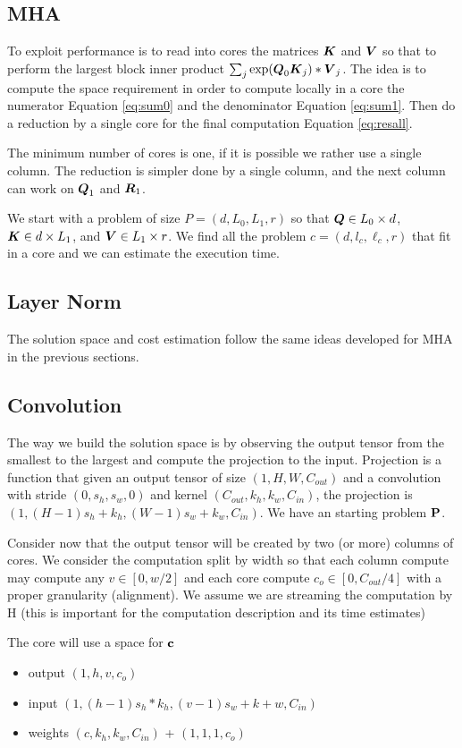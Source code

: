 \documentclass[conference]{IEEEtran}
\begin{document}
\subsection{MHA}
To exploit performance is to read into cores the matrices ${\boldsymbol K}$ and
${\boldsymbol V}$ so that to perform the largest block inner product
$\sum_j\exp({\boldsymbol Q}_0{\boldsymbol K}_j)*{\boldsymbol V}_j$. The idea is to compute the
space requirement in order to compute locally in a core the numerator
Equation \ref{eq:sum0} and the denominator Equation
\ref{eq:sum1}. Then do a reduction by a single core for the final
computation Equation \ref{eq:resall}.

The minimum number of cores is one, if it is possible we rather use a
single column. The reduction is simpler done by a single column, and
the next column can work on ${\boldsymbol Q}_1$ and ${\boldsymbol R}_1$.

We start with a problem of size $P=(d,L_0,L_1,r)$ so that ${\boldsymbol Q} \in
L_0\times d$, ${\boldsymbol K} \in d\times L_1$, and ${\boldsymbol V} \in L_1\times
r$. We find all the problem $c=(d,l_c,\ell_c,r)$ that fit in a core
and we can estimate the execution time.

\subsection{Layer Norm}
The solution space and cost estimation follow the same ideas developed
for MHA in the previous sections.

\subsection{Convolution}
The way we build the solution space is by observing the output tensor
from the smallest to the largest and compute the projection to the
input. Projection is a function that given an output tensor of size
$(1,H,W,C_{out})$ and a convolution with stride $(0, s_h, s_w,0)$ and
kernel $(C_{out}, k_h, k_w,C_{in})$, the projection is $(1,
(H-1)s_h+k_h, (W-1)s_w+k_w,C_{in})$. We have an starting problem ${\bf
  P}$.

Consider now that the output tensor will be created by two (or more)
columns of cores. We consider the computation split by width so that
each column compute may compute any $v \in [0,w/2]$ and each core
compute $c_o \in [0,C_{out}/4]$ with a proper granularity
(alignment). We assume we are streaming the computation by H (this is
important for the computation description and its time estimates)

The core will use a space for ${\bf c}$
\begin{itemize}
  \item output $(1,h,v,c_o)$ 
  \item input  $(1,(h-1)s_h*k_h,(v-1)s_w+k+w,C_{in})$ 
  \item weights $(c,k_h,k_w,C_{in})$ + $(1,1,1,c_o)$ 
\end{itemize}
\end{document}
